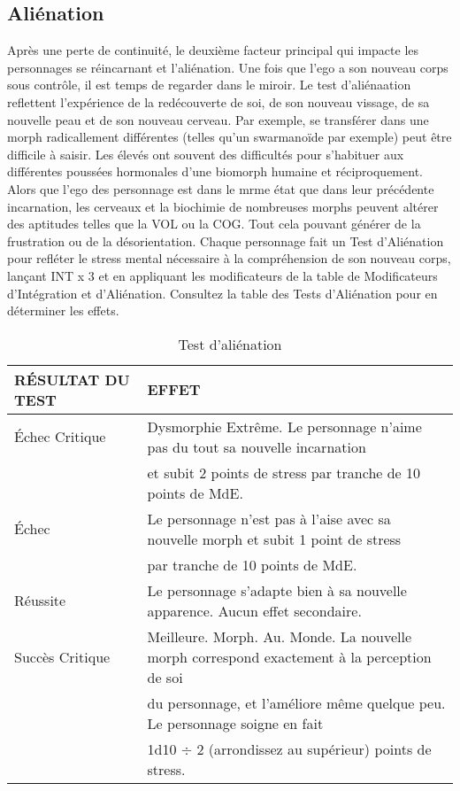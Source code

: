 \subsection{Aliénation} 

Après une perte de continuité, le deuxième facteur principal qui impacte les personnages se réincarnant et l'aliénation. Une fois que l'ego a son nouveau corps sous contrôle, il est temps de regarder dans le miroir. Le test d'aliénaation reflettent l'expérience de la redécouverte de soi, de son nouveau vissage, de sa nouvelle peau et de son nouveau cerveau. Par exemple, se transférer dans une morph radicallement différentes (telles qu'un swarmanoïde par exemple) peut être difficile à saisir. Les élevés ont souvent des difficultés pour s'habituer aux différentes poussées hormonales d'une biomorph humaine et réciproquement. Alors que l'ego des personnage est dans le mrme état que dans leur précédente incarnation, les cerveaux et la biochimie de nombreuses morphs peuvent altérer des aptitudes telles que la VOL ou la COG. Tout cela pouvant générer de la frustration ou de la désorientation. Chaque personnage fait un Test d'Aliénation pour refléter le stress mental nécessaire à la compréhension de son nouveau corps, lançant INT x 3 et en appliquant les modificateurs de la table de Modificateurs d'Intégration et d'Aliénation. Consultez la table des Tests d'Aliénation pour en déterminer les effets. \\ 

\begin{table} \caption{Test d'aliénation} \begin{tabular}{|l|l|} 



\hline

RÉSULTAT DU TEST &EFFET\\ \hline

Échec Critique &Dysmorphie Extrême. Le personnage n'aime pas du tout sa nouvelle incarnation \\ &et subit 2 points de stress par tranche de 10 points de MdE. \\ \hline

Échec &Le personnage n'est pas à l'aise avec sa nouvelle morph et subit 1 point de stress \\ &par tranche de 10 points de MdE. \\ \hline

Réussite &Le personnage s'adapte bien à sa nouvelle apparence. Aucun effet secondaire. \\ \hline

Succès Critique &Meilleure. Morph. Au. Monde. La nouvelle morph correspond exactement à la perception de soi \\ &du personnage, et l'améliore même quelque peu. Le personnage soigne en fait \\ &1d10 $\div$ 2 (arrondissez au supérieur) points de stress. \\ \hline

\end{tabular} \end{table} 


